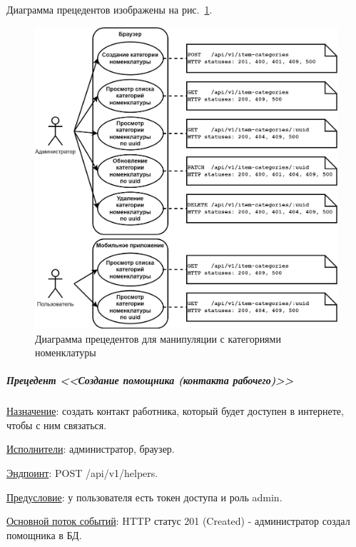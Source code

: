 Диаграмма прецедентов изображены на рис.~\ref{fig:UML_precedent_item_categories}.


\begin{figure}[!htb]
    \centering

    \includegraphics[width=15cm]
    {images/UML/UML_precedent_item_categories.png}

    \caption{Диаграмма прецедентов для манипуляции с категориями номенклатуры}

    \label{fig:UML_precedent_item_categories}
\end{figure}


\subparagraph{Прецедент <<Создание помощника (контакта рабочего)>>} \hspace{0pt}

\underline{Назначение}: создать контакт работника, который будет доступен в интернете, чтобы с ним связаться.

\underline{Исполнители}: администратор, браузер.

\underline{Эндпоинт}: POST /api/v1/helpers.

\underline{Предусловие}: у пользователя есть токен доступа и роль admin.

\underline{Основной поток событий}: HTTP статус 201 (Created) - администратор создал помощника в БД. 

